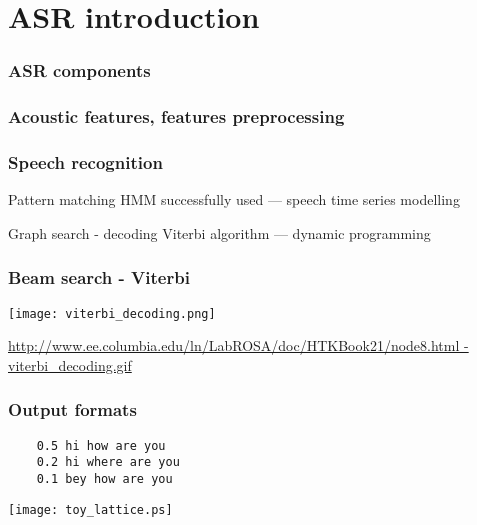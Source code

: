 \section{ASR introduction} %

\begin{frame}\frametitle{ASR components} 
    
\end{frame}

\begin{frame}\frametitle{Acoustic features, features preprocessing} 
    
    
\end{frame}

\begin{frame}\frametitle{Speech recognition} 
    \begin{block}{Pattern matching}
        HMM successfully used --- speech time series modelling 
    \end{block}
    \begin{exampleblock}{Graph search - decoding}
        Viterbi algorithm --- dynamic programming
    \end{exampleblock}
\end{frame}

\begin{frame}\frametitle{Beam search - Viterbi}
    \begin{center}
        \texttt{[image: viterbi\_decoding.png]}
    \end{center}
    \tiny{\url{http://www.ee.columbia.edu/ln/LabROSA/doc/HTKBook21/node8.html  - viterbi_decoding.gif}}
\end{frame}

\begin{frame}[fragile]\frametitle{Output formats} 

\begin{verbatim}
    0.5 hi how are you
    0.2 hi where are you
    0.1 bey how are you
\end{verbatim}

    \begin{center}
        \texttt{[image: toy\_lattice.ps]}
    \end{center}
\end{frame}


